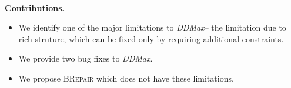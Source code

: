 \documentclass[sigconf,review,anonymous]{acmart}
\makeatletter
\newcounter{todocounter}
\newcommand{\todo}[1]{\marginpar{$|$}\textcolor{red}{\stepcounter{todocounter}\footnote[\thetodocounter]{\textcolor{red}{\textbf{TODO }}\textit{#1}}}}
\renewcommand{\todo}[1]{}
\newcommand{\approach}{\textsc{BRepair}\xspace}
\newcommand{\ddmax}{\textit{DDMax}\xspace}
\newcommand{\brepair}{\textit{brepair}\xspace}
\newcommand\letterboxed[1]{%
\setlength{\fboxsep}{0pt}%
  \@tfor\@ii:=#1\do{%
    \fcolorbox{white}{light-gray}{\texttt{\strut\@ii}}%
  }%
}
\makeatother
\begin{document}
% 

\todo{
\textbf{note:} In the algorithm, we need to limit possible insertions.
Unconstrained insertions are possible only for two characters. If we
have constraints on the initial character, more insertions can be allowed,
until the choices reach a configurable number (e.g. 100,000)
beyond which deletion should take precedence.
}
\\
\noindent\textbf{Contributions.}
\begin{itemize}
  \item We identify one of the major limitations to \ddmax -- the limitation due to rich struture, which can be fixed only by requiring additional constraints.
  \item We provide two bug fixes to \ddmax.
  \item We propose \approach which does not have these limitations.
\end{itemize}
\end{document}
